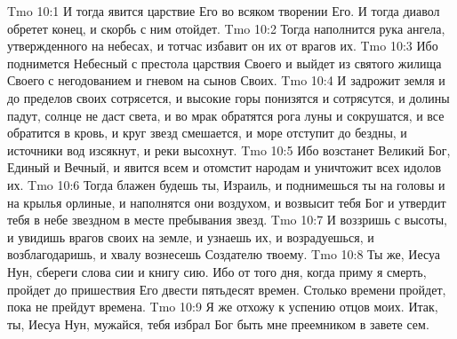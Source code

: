 \vs Tmo 10:1
И тогда явится царствие Его во всяком творении Его. И тогда диавол обретет конец, и скорбь с ним отойдет.
\vs Tmo 10:2
Тогда наполнится рука ангела, утвержденного на небесах, и тотчас избавит он их от врагов их.
\vs Tmo 10:3
Ибо поднимется Небесный с престола царствия Своего и выйдет из святого жилища Своего с негодованием и гневом на сынов Своих.
\vs Tmo 10:4
И задрожит земля и до пределов своих сотрясется, и высокие горы понизятся и сотрясутся, и долины падут, солнце не даст света, и во мрак обратятся рога луны и сокрушатся, и все обратится в кровь, и круг звезд смешается, и море отступит до бездны, и источники вод изсякнут, и реки высохнут.
\vs Tmo 10:5
Ибо возстанет Великий Бог, Единый и Вечный, и явится всем и отомстит народам и уничтожит всех идолов их.
\vs Tmo 10:6
Тогда блажен будешь ты, Израиль, и поднимешься ты на головы и на крылья орлиные, и наполнятся они воздухом, и возвысит тебя Бог и утвердит тебя в небе звездном в месте пребывания звезд.
\vs Tmo 10:7
И воззришь с высоты, и увидишь врагов своих на земле, и узнаешь их, и возрадуешься, и возблагодаришь, и хвалу вознесешь Создателю твоему.
\vs Tmo 10:8
Ты же, Иесуа Нун, сбереги слова сии и книгу сию. Ибо от того дня, когда приму я смерть, пройдет до пришествия Его двести пятьдесят времен. Столько времени пройдет, пока не прейдут времена.
\vs Tmo 10:9
Я же отхожу к успению отцов моих. Итак, ты, Иесуа Нун, мужайся, тебя избрал Бог быть мне преемником в завете сем.

